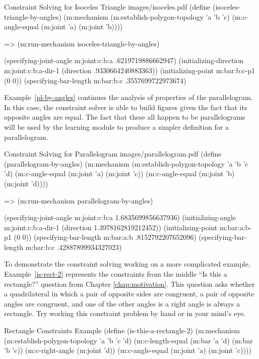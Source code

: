 \begin{pdf-example}
[label=solve-i-t]
{Constraint Solving for Isoceles Triangle}
{images/isoceles.pdf}
(define (isoceles-triangle-by-angles)
  (m:mechanism
   (m:establish-polygon-topology 'a 'b 'c)
   (m:c-angle-equal (m:joint 'a)
                    (m:joint 'b))))

=> (m:run-mechanism  isoceles-triangle-by-angles)

(specifying-joint-angle m:joint:c:b:a .6219719886662947)
(initializing-direction m:joint:c:b:a-dir-1 (direction .9330664240883363))
(initializing-point m:bar:b:c-p1 (0 0))
(specifying-bar-length m:bar:b:c .3557699722973674)
\end{pdf-example}

Example~\ref{pl-by-angles} continues the analysis of properties of the
parallelogram. In this case, the constraint solver is able to build
figures given the fact that its opposite angles are equal. The fact
that these all happen to be parallelograms will be used by the
learning module to produce a simpler definition for a parallelogram.

\begin{pdf-example}
[label=pl-by-angles]
{Constraint Solving for Parallelogram}
{images/parallelogram.pdf}
(define (parallelogram-by-angles)
  (m:mechanism
   (m:establish-polygon-topology 'a 'b 'c 'd)
   (m:c-angle-equal (m:joint 'a)
                    (m:joint 'c))
   (m:c-angle-equal (m:joint 'b)
                    (m:joint 'd))))

=> (m:run-mechanism parallelogram-by-angles)

(specifying-joint-angle m:joint:c:b:a 1.6835699856637936)
(initializing-angle m:joint:c:b:a-dir-1 (direction 1.3978162819212452))
(initializing-point m:bar:a:b-p1 (0 0))
(specifying-bar-length m:bar:a:b .8152792207652096)
(specifying-bar-length m:bar:b:c .42887899934327023)
\end{pdf-example}

To demonstrate the constraint solving working on a more complicated
example, Example~\ref{is-rect-2} represents the constraints from the
middle ``Is this a rectangle?'' question from Chapter
\ref{chap:motivation}. This question asks whether a quadrilateral in
which a pair of opposite sides are congruent, a pair of opposite
angles are congruent, and one of the other angles is a right angle is
always a rectangle. Try working this constraint problem by hand or in
your mind's eye.

\begin{code-example}
[label=is-rect-2]
{Rectangle Constraints Example}
(define (is-this-a-rectangle-2)
  (m:mechanism
   (m:establish-polygon-topology 'a 'b 'c 'd)
   (m:c-length-equal (m:bar 'a 'd) (m:bar 'b 'c))
   (m:c-right-angle (m:joint 'd))
   (m:c-angle-equal (m:joint 'a) (m:joint 'c))))
\end{code-example}

